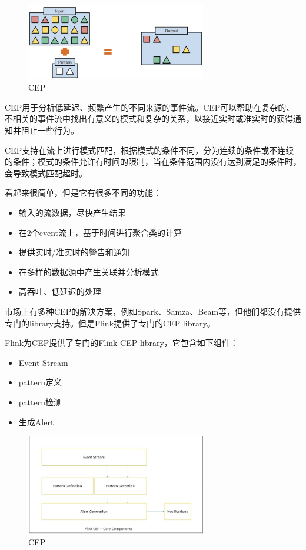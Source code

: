 \documentclass[cn,11pt,chinese]{elegantbook}
\begin{document}
\begin{figure}[htbp]
    \centering
    \includegraphics[width=0.7\textwidth]{images/flink-cep.png}
    \caption{CEP}
\end{figure}

CEP用于分析低延迟、频繁产生的不同来源的事件流。CEP可以帮助在复杂的、不相关的事件流中找出有意义的模式和复杂的关系，以接近实时或准实时的获得通知并阻止一些行为。

CEP支持在流上进行模式匹配，根据模式的条件不同，分为连续的条件或不连续的条件；模式的条件允许有时间的限制，当在条件范围内没有达到满足的条件时，会导致模式匹配超时。

看起来很简单，但是它有很多不同的功能：

\begin{itemize}
    \item 输入的流数据，尽快产生结果
    \item 在2个event流上，基于时间进行聚合类的计算
    \item 提供实时/准实时的警告和通知
    \item 在多样的数据源中产生关联并分析模式
    \item 高吞吐、低延迟的处理	
\end{itemize}

市场上有多种CEP的解决方案，例如Spark、Samza、Beam等，但他们都没有提供专门的library支持。但是Flink提供了专门的CEP library。

Flink为CEP提供了专门的Flink CEP library，它包含如下组件：

\begin{itemize}
    \item Event Stream
    \item pattern定义
    \item pattern检测
    \item 生成Alert
\end{itemize}

\begin{figure}[htbp]
    \centering
    \includegraphics[width=0.7\textwidth]{images/cep6.png}
    \caption{CEP}
\end{figure}
\end{document}
